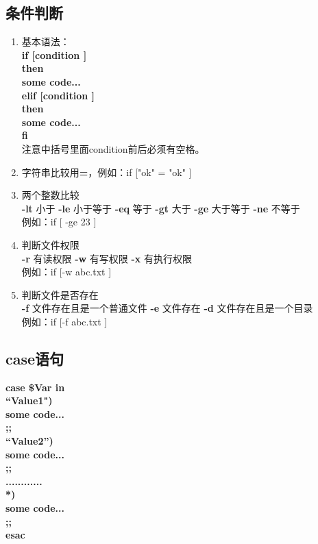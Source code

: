 \documentclass[11pt]{article}
\begin{document}
\subsection{条件判断}
\begin{enumerate}
    \item 基本语法：\\
    \textbf{
        if [\quad condition \quad]  \\
        then \\
        some code... \\
        elif [\quad condition \quad]\\
        then \\
        some code... \\
        fi
    } \\
    注意中括号里面condition前后必须有空格。
    \item 字符串比较用\textbf{=}，例如：if [\quad "ok" = "ok" \quad]
    \item 两个整数比较 \\
    \textbf{-lt} 小于 \qquad \textbf{-le} 小于等于 \qquad \textbf{-eq} 等于 \qquad
    \textbf{-gt} 大于 \qquad \textbf{-ge} 大于等于 \qquad \textbf{-ne} 不等于 \\
    例如：if [ -ge 23 \quad]
    \item 判断文件权限 \\
    \textbf{-r} 有读权限 \qquad \textbf{-w} 有写权限 \qquad \textbf{-x} 有执行权限 \\
    例如：if [\quad -w abc.txt \quad]
    \item 判断文件是否存在 \\
    \textbf{-f} 文件存在且是一个普通文件 \qquad \textbf{-e} 文件存在 \qquad \textbf{-d}
    文件存在且是一个目录 \\
    例如：if [\quad -f abc.txt \quad]
\end{enumerate}

\subsection{case语句}
\textbf{
    case \$Var in \\
    ``Value1") \\
    some code... \\
    ;; \\
    ``Value2'') \\
    some code... \\
    ;; \\
    ............ \\
    *) \\
    some code... \\
    ;; \\
    esac
}
\end{document}
